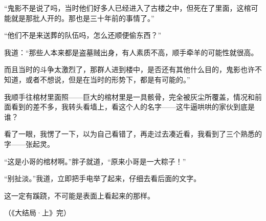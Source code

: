 “鬼影不是说了吗，当时他们好多人已经进入了古楼之中，但死在了里面，这棺可能就是那批人开的。那也是三十年前的事情了。”

“他们不是来送葬的队伍吗，怎么还顺便偷东西？”

我道：“那些人本来都是盗墓贼出身，有人素质不高，顺手牵羊的可能性就很高。

而且当时的斗争太激烈了，那群人进到楼中，是否还有其他什么目的，鬼影也许不知道，或者不想说，但是在当时的形势下，都是有可能的。”

我顺手往棺材里面照——巨大的棺材里是一具骸骨，完全被灰尘所覆盖，情况和前面看到的差不多，我转头看墙上，看这个人的名字——这牛逼哄哄的家伙到底是谁？

看了一眼，我愣了一下，以为自己看错了，再走过去凑近看，我看到了三个熟悉的字——张起灵。

“这是小哥的棺材啊。”胖子就道，“原来小哥是一大粽子！”

“别扯淡。”我道，立即把手电举了起来，仔细去看后面的文字。

这一定有蹊跷，不可能是表面上看起来的那样。

{\fzqiti\hfill （《大结局·上》完）}
